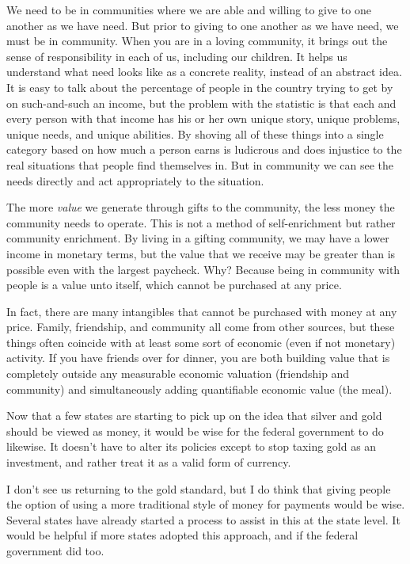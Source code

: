 We need to be in communities where we are able and willing to give to
one another as we have need. But prior to giving to one another as we
have need, we must be in community. When you are in a loving community,
it brings out the sense of responsibility in each of us, including our
children. It helps us understand what need looks like as a concrete
reality, instead of an abstract idea. It is easy to talk about the
percentage of people in the country trying to get by on such-and-such
an income, but the problem with the statistic is that each and every
person with that income has his or her own unique story, unique
problems, unique needs, and unique abilities. By shoving all of these
things into a single category based on how much a person earns is
ludicrous and does injustice to the real situations that people find
themselves in. But in community we can see the needs directly and act
appropriately to the situation. 

The more \textit{value} we generate through gifts to the community, the
less money the community needs to operate. This is not a method of
self-enrichment but rather community enrichment. By living in a gifting
community, we may have a lower income in monetary terms, but the value
that we receive may be greater than is possible even with the largest
paycheck. Why?  Because being in community with people is a value unto
itself, which cannot be purchased at any price.

In fact, there are many intangibles that cannot be purchased with money
at any price. Family, friendship, and community all come from other
sources, but these things often coincide with at least some sort of
economic (even if not monetary) activity. If you have friends over for
dinner, you are both building value that is completely outside any
measurable economic valuation (friendship and community) and
simultaneously adding quantifiable economic value (the meal).

\begin{policynote}
Now that a few states are starting to pick up on the idea that silver
and gold should be viewed as money, it would be wise for the federal
government to do likewise. It doesn’t have to alter its policies except
to stop taxing gold as an investment, and rather treat it as a valid
form of currency.

I don’t see us returning to the gold standard, but I do think that
giving people the option of using a more traditional style of money for
payments would be wise. Several states have already started a process
to assist in this at the state level. It would be helpful if more
states adopted this approach, and if the federal government did too.
\end{policynote}
